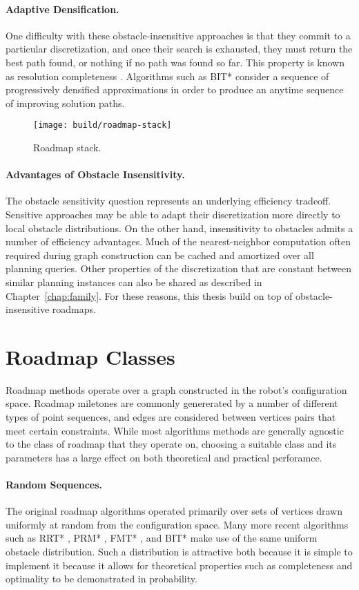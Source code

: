 \paragraph{Adaptive Densification.}
One difficulty with these obstacle-insensitive approaches
is that they commit to a particular discretization,
and once their search is exhausted,
they must return the best path found,
or nothing if no path was found so far.
This property is known as resolution completeness
\citep{cheng2004rescomplete}.
Algorithms such as BIT* \citep{gammell2015bitstar}
consider a sequence of progressively densified approximations
in order to produce an anytime sequence of improving solution paths.

\begin{figure}
   \centering
   \texttt{[image: build/roadmap-stack]}
   \caption{Roadmap stack.}
\end{figure}

\paragraph{Advantages of Obstacle Insensitivity.}
The obstacle sensitivity question represents an underlying efficiency
tradeoff.
Sensitive approaches may be able to adapt their discretization more
directly to local obstacle distributions.
On the other hand,
insensitivity to obstacles admits a number of efficiency advantages.
Much of the nearest-neighbor computation
often required during graph construction can be cached and amortized
over all planning queries.
Other properties of the discretization that are constant between
similar planning instances can also be shared
as described in Chapter~\ref{chap:family}.
For these reasons,
this thesis build on top of obstacle-insensitive roadmaps.

\section{Roadmap Classes}

Roadmap methods operate over a graph constructed in the
robot's configuration space.
Roadmap miletones are commonly genererated by a number of different
types of point sequences,
and edges are considered between vertices pairs that meet
certain constraints.
While most algorithms methods are generally agnostic
to the class of roadmap that they operate on,
choosing a suitable class and its parameters has a large effect
on both theoretical and practical perforamce.

\paragraph{Random Sequences.}
The original roadmap algorithms
\citep{kavrakietal1996prm}
operated primarily over sets
of vertices drawn uniformly at random from the configuration space.
Many more recent algorithms such as
RRT* \citep{karaman2010rrtstar},
PRM* \citep{karaman2011samplingoptimal},
FMT* \citep{janson2015fmtstar},
and BIT* \citep{gammell2015bitstar} make use of the same
uniform obstacle distribution.
Such a distribution is attractive both because
it is simple to implement
it because it allows for theoretical properties such as
completeness and optimality to be demonstrated
in probability.

